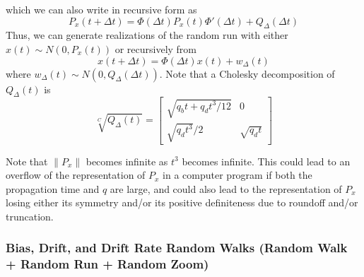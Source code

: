 which we can also write in recursive form as
\begin{equation}
	P_x(t+\Delta t) = \Phi(\Delta t)P_x(t)\Phi'(\Delta t) + Q_\Delta(\Delta t)
\end{equation}
Thus, we can generate realizations of the random run with either $x(t) \sim N(0, P_x(t))$ or recursively from
\begin{equation}
	x(t+\Delta t) = \Phi(\Delta t) x(t) + w_\Delta(t)
\end{equation}
where $w_\Delta(t) \sim N(0, Q_\Delta(\Delta t))$.  Note that a Cholesky decomposition of $Q_\Delta(t)$ is
\begin{equation}
	\sqrt[C]{Q_\Delta(t)} = \begin{bmatrix} \sqrt{q_b t + q_d t^3/12} & 0 \\ \sqrt{q_d t^3}/2 & \sqrt{q_d t} \end{bmatrix}
\end{equation}

Note that $\|P_x\|$ becomes infinite as $t^3$ becomes infinite.  This could lead to an overflow of the representation of $P_x$ in a computer program if both the propagation time and $q$ are large, and could also lead to the representation of $P_x$ losing either its symmetry and/or its positive definiteness due to roundoff and/or truncation.

\subsubsection{Bias, Drift, and Drift Rate Random Walks (Random Walk + Random Run + Random Zoom)}

